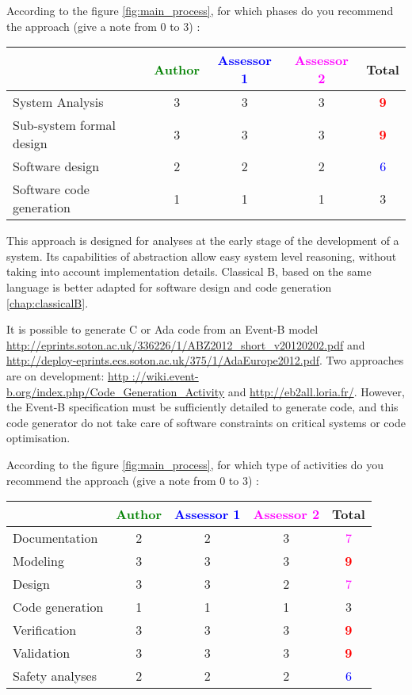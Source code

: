 According to the figure \ref{fig:main_process}, for which phases do you recommend the approach (give a note from 0 to  3) :

\begin{tabular}{|l | c | c | c | c|}
\hline
& \textcolor{green}{Author} & \textcolor{blue}{Assessor 1} & \textcolor{magenta}{Assessor 2} & Total \\
\hline 
System Analysis & 3     & 3     & 3     & \textcolor{red}{\textbf{9}} \\
\hline
Sub-system formal design & 3     & 3     & 3     & \textcolor{red}{\textbf{9}} \\
\hline
Software design & 2     & 2     & 2     & \textcolor{blue}{6} \\
\hline
Software code generation & 1     & 1     & 1     & 3     \\
\hline
\end{tabular}

\begin{author_comment}
This approach is designed for analyses at the early stage of the development of a system. Its capabilities of abstraction allow easy system level reasoning, without taking into account implementation details. Classical B, based on the same language is better adapted for software design and code generation \ref{chap:classicalB}.

It is possible to generate C or Ada code from an Event-B model \url{http://eprints.soton.ac.uk/336226/1/ABZ2012_short_v20120202.pdf} and \url{http://deploy-eprints.ecs.soton.ac.uk/375/1/AdaEurope2012.pdf}. Two  approaches are on development: \url{http ://wiki.event-b.org/index.php/Code_Generation_Activity} and \url{http://eb2all.loria.fr/}. However, the Event-B specification must be sufficiently detailed to generate code, and this code generator do not take care of software constraints on critical systems or code optimisation.
\end{author_comment}


According to the figure \ref{fig:main_process}, for which type of activities do you recommend the approach (give a note from 0 to  3) :

\begin{tabular}{|l | c | c | c | c|}
\hline
& \textcolor{green}{Author} & \textcolor{blue}{Assessor 1} & \textcolor{magenta}{Assessor 2} & Total \\
\hline 
Documentation & 2     & 2     & 3     & \textcolor{magenta}{7} \\
\hline
Modeling & 3     & 3     & 3     & \textcolor{red}{\textbf{9}} \\
\hline
Design & 3     & 3     & 2     & \textcolor{magenta}{7} \\
\hline
Code generation & 1     & 1     & 1     & 3     \\
\hline
Verification & 3     & 3     & 3     & \textcolor{red}{\textbf{9}} \\
\hline
Validation & 3     & 3     & 3     & \textcolor{red}{\textbf{9}} \\
\hline
Safety analyses & 2     & 2     & 2     & \textcolor{blue}{6} \\
\hline
\end{tabular}


